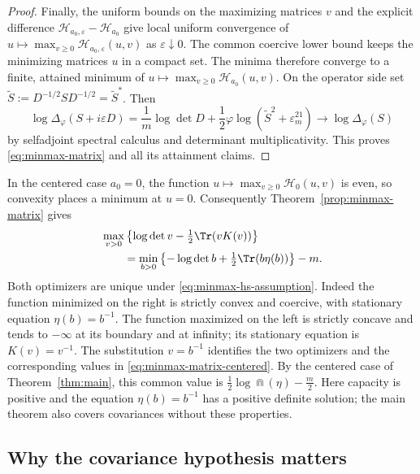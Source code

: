 \begin{proof}
Finally, the uniform bounds on the maximizing matrices $v$ and the explicit difference $\mathcal H_{a_0,\varepsilon}-\mathcal H_{a_0}$ give local uniform convergence of $u\mapsto\max_{v\ge0}\mathcal H_{a_0,\varepsilon}(u,v)$ as $\varepsilon\downarrow0$.
The common coercive lower bound keeps the minimizing matrices $u$ in a compact set.
The minima therefore converge to a finite, attained minimum of $u\mapsto\max_{v\ge0}\mathcal H_{a_0}(u,v)$.
On the operator side set $\widetilde S:=D^{-1/2}SD^{-1/2}=\widetilde S^*$.
Then
\[
 \log\Delta_\varphi(S+i\varepsilon D)
 =\frac1m\log\det D
   +\frac12\varphi\log(\widetilde S^2+\varepsilon^21_m)
 \longrightarrow\log\Delta_\varphi(S)
\]
by selfadjoint spectral calculus and determinant multiplicativity.
This proves \eqref{eq:minmax-matrix} and all its attainment claims.
\end{proof}

In the centered case $a_0=0$, the function $u\mapsto\max_{v\ge0}\mathcal H_0(u,v)$ is even, so convexity places a minimum at $u=0$.
Consequently Theorem~\ref{prop:minmax-matrix} gives
\begin{equation}\label{eq:minmax-matrix-centered}
\begin{split}
 &\max_{v>0}\left\{\log\det v-\tfrac12\Tr(vK(v))\right\}\\
 &\qquad=\min_{b>0}\left\{-\log\det b+\tfrac12\Tr(b\eta(b))\right\}-m.
\end{split}
\end{equation}
Both optimizers are unique under \eqref{eq:minmax-hs-assumption}.
Indeed the function minimized on the right is strictly convex and coercive, with stationary equation $\eta(b)=b^{-1}$.
The function maximized on the left is strictly concave and tends to $-\infty$ at its boundary and at infinity; its stationary equation is $K(v)=v^{-1}$.
The substitution $v=b^{-1}$ identifies the two optimizers and the corresponding values in \eqref{eq:minmax-matrix-centered}.
By the centered case of Theorem~\ref{thm:main}, this common value is $\frac12\log\Cap(\eta)-\frac m2$.
Here capacity is positive and the equation $\eta(b)=b^{-1}$ has a positive definite solution; the main theorem also covers covariances without these properties.

\subsection{Why the covariance hypothesis matters}

